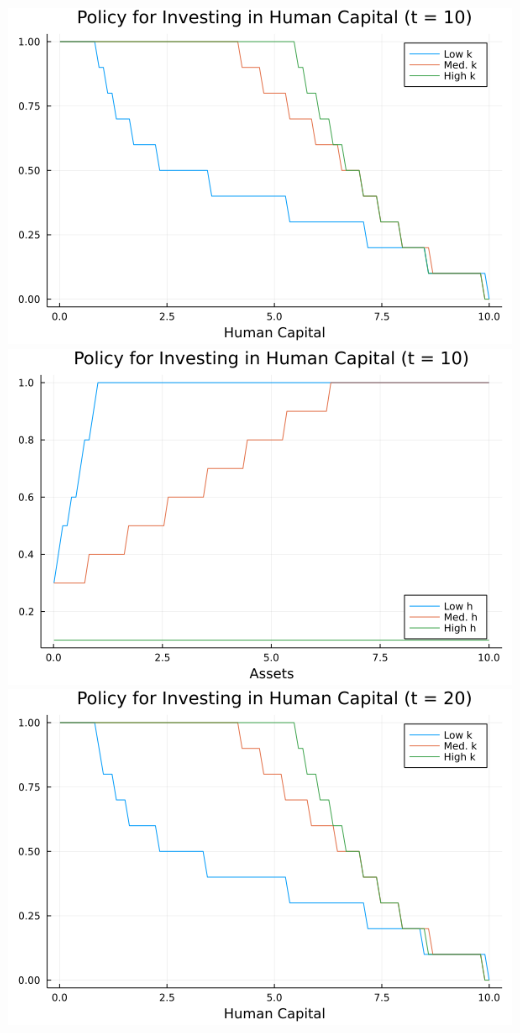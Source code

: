 \documentclass{article}
\begin{document}
\begin{enumerate}
\begin{center}
\includegraphics[scale = 0.5]{figure_2_10_pf_h}
\includegraphics[scale = 0.5]{figure_2_10_pf_k}
\includegraphics[scale = 0.5]{figure_2_20_pf_h}

\end{center}
\end{enumerate}
\end{document}
